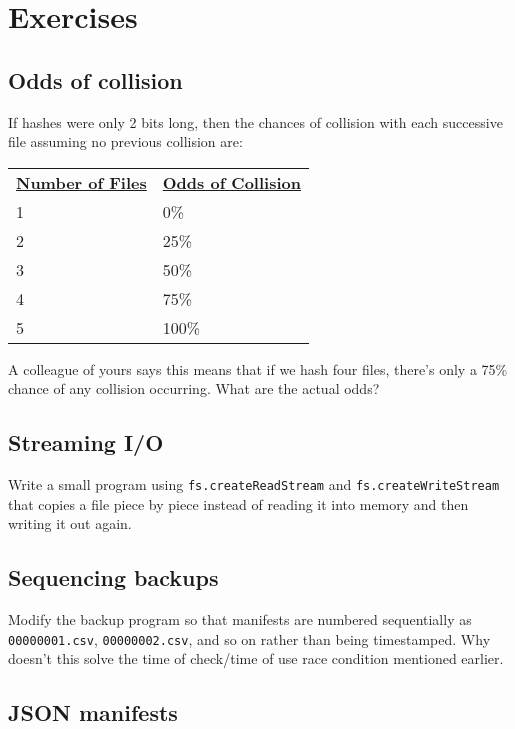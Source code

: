 \documentclass{scrbook}
\begin{document}
\section{Exercises}\label{backup-exercises}

\subsection*{Odds of collision}


If hashes were only 2 bits long,
then the chances of collision with each successive file
assuming no previous collision are:


\vspace{\baselineskip}
\begin{tabular}{ll}
\textbf{\underline{Number of Files}} & \textbf{\underline{Odds of Collision}} \\
1 & 0\% \\
2 & 25\% \\
3 & 50\% \\
4 & 75\% \\
5 & 100\% \\
\end{tabular}

\vspace{\baselineskip}


A colleague of yours says this means that if we hash four files,
there's only a 75\% chance of any collision occurring.
What are the actual odds?

\subsection*{Streaming I/O}


Write a small program using \texttt{fs.createReadStream} and \texttt{fs.createWriteStream}
that copies a file piece by piece
instead of reading it into memory and then writing it out again.

\subsection*{Sequencing backups}


Modify the backup program so that manifests are numbered sequentially
as \texttt{00000001.csv}, \texttt{00000002.csv}, and so on
rather than being timestamped.
Why doesn't this solve the time of check/time of use race condition mentioned earlier.

\subsection*{JSON manifests}
\end{document}
